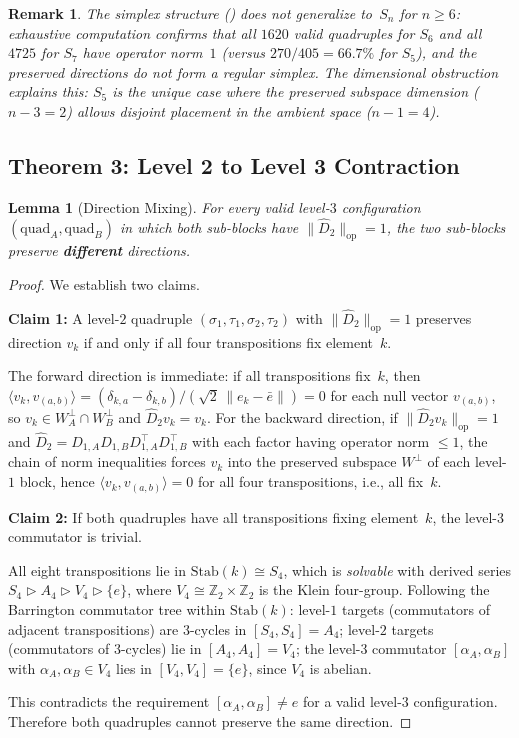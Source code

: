 \documentclass[11pt]{article}
\newtheorem{lemma}[theorem]{Lemma}
\newtheorem{remark}[theorem]{Remark}
\newcommand{\norm}[1]{\lVert #1 \rVert}
\newcommand{\opn}[1]{\norm{#1}_{\mathrm{op}}}
\newcommand{\Dhat}{\widehat{D}}
\begin{document}
\begin{remark}
The simplex structure () does not generalize to~$S_n$
for $n \geq 6$: exhaustive computation confirms that all $1620$ valid
quadruples for $S_6$ and all $4725$ for $S_7$ have operator norm~$1$
(versus $270/405 = 66.7\%$ for $S_5$), and the preserved directions
do not form a regular simplex. The dimensional obstruction explains this:
$S_5$ is the unique case where the preserved subspace dimension ($n-3 = 2$)
allows disjoint placement in the ambient space ($n-1 = 4$).
\end{remark}


\subsection{Theorem 3: Level 2 to Level 3 Contraction}

\begin{lemma}[Direction Mixing]
\label{lem:mixing}
For every valid level-$3$ configuration $(\mathrm{quad}_A, \mathrm{quad}_B)$
in which both sub-blocks have $\opn{\Dhat_2} = 1$, the two sub-blocks
preserve \textbf{different} directions.
\end{lemma}

\begin{proof}
We establish two claims.

\textbf{Claim 1:} A level-$2$ quadruple $(\sigma_1, \tau_1, \sigma_2, \tau_2)$
with $\opn{\Dhat_2} = 1$ preserves direction $v_k$ if and only if all four
transpositions fix element~$k$.

The forward direction is immediate: if all transpositions fix~$k$, then
$\langle v_k, v_{(a,b)} \rangle = (\delta_{k,a} - \delta_{k,b})/(\sqrt{2}\,\norm{e_k - \bar{e}}) = 0$
for each null vector $v_{(a,b)}$, so $v_k \in W_A^\perp \cap W_B^\perp$ and $\Dhat_2 v_k = v_k$.
For the backward direction, if $\opn{\Dhat_2 v_k} = 1$ and $\Dhat_2 = D_{1,A} D_{1,B} D_{1,A}^\top D_{1,B}^\top$
with each factor having operator norm $\leq 1$, the chain of norm inequalities forces
$v_k$ into the preserved subspace $W^\perp$ of each level-$1$ block, hence
$\langle v_k, v_{(a,b)} \rangle = 0$ for all four transpositions, i.e., all fix~$k$.

\textbf{Claim 2:} If both quadruples have all transpositions fixing element~$k$,
the level-$3$ commutator is trivial.

All eight transpositions lie in $\mathrm{Stab}(k) \cong S_4$, which is
\emph{solvable} with derived series
$S_4 \rhd A_4 \rhd V_4 \rhd \{e\}$,
where $V_4 \cong \mathbb{Z}_2 \times \mathbb{Z}_2$ is the Klein four-group.
Following the Barrington commutator tree within $\mathrm{Stab}(k)$:
level-$1$ targets (commutators of adjacent transpositions) are $3$-cycles
in $[S_4, S_4] = A_4$;
level-$2$ targets (commutators of $3$-cycles) lie in $[A_4, A_4] = V_4$;
the level-$3$ commutator $[\alpha_A, \alpha_B]$ with $\alpha_A, \alpha_B \in V_4$
lies in $[V_4, V_4] = \{e\}$, since $V_4$ is abelian.

This contradicts the requirement $[\alpha_A, \alpha_B] \neq e$ for a valid
level-$3$ configuration. Therefore both quadruples cannot preserve the same
direction.
\end{proof}
\end{document}
